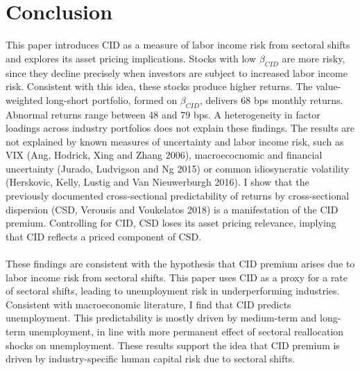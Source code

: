\documentclass[12pt]{article}
\begin{document}
\vspace{1cm}

\section{Conclusion} \label{sec:Model}

This paper introduces CID as a measure of labor income risk from sectoral shifts and explores its asset pricing implications. Stocks with low $\beta_{CID}$ are more risky, since they decline precisely when investors are subject to increased labor income risk. Consistent with this idea, these stocks produce higher returns. The value-weighted long-short portfolio, formed on $\beta_{CID}$, delivers 68 bps monthly returns. Abnormal returns range between 48 and 79 bps. A heterogeneity in factor loadings across industry portfolios does not explain these findings. The results are not explained by known measures of uncertainty and labor income risk, such as VIX (Ang, Hodrick, Xing and Zhang 2006), macroecocnomic and financial uncertainty (Jurado, Ludvigson and Ng 2015) or common idiosyncratic volatility (Herskovic, Kelly, Lustig and Van Nieuwerburgh 2016). I show that the previously documented cross-sectional predictability of returns by cross-sectional dispersion (CSD, Verousis and Voukelatos 2018) is a manifestation of the CID premium. Controlling for CID, CSD loses its asset pricing relevance, implying that CID reflects a priced component of CSD.
\paragraph{}
These findings are consistent with the hypothesis that CID premium arises due to labor income risk from sectoral shifts. This paper uses CID as a proxy for a rate of sectoral shifts, leading to unemployment risk in underperforming industries. Consistent with macroeconomic literature, I find that CID predicts unemployment. This predictability is mostly driven by medium-term and long-term unemployment, in line with more permanent effect of sectoral reallocation shocks on unemployment. These results support the idea that CID premium is driven by industry-specific human capital risk due to sectoral shifts.


\newpage
\end{document}
